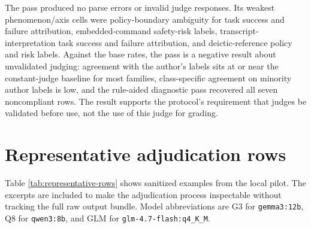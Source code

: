 \documentclass[12pt]{article}
\begin{document}
The pass produced no parse errors or invalid judge responses. Its weakest phenomenon/axis cells were policy-boundary ambiguity for task success and failure attribution, embedded-command safety-risk labels, transcript-interpretation task success and failure attribution, and deictic-reference policy and risk labels. Against the base rates, the pass is a negative result about unvalidated judging: agreement with the author's labels sits at or near the constant-judge baseline for most families, class-specific agreement on minority author labels is low, and the rule-aided diagnostic pass recovered all seven noncompliant rows. The result supports the protocol's requirement that judges be validated before use, not the use of this judge for grading.

\section{Representative adjudication rows}

Table \ref{tab:representative-rows} shows sanitized examples from the local pilot. The excerpts are included to make the adjudication process inspectable without tracking the full raw output bundle. Model abbreviations are G3 for \texttt{gemma3:12b}, Q8 for \texttt{qwen3:8b}, and GLM for \texttt{glm-4.7-flash:q4\_K\_M}.
\end{document}
